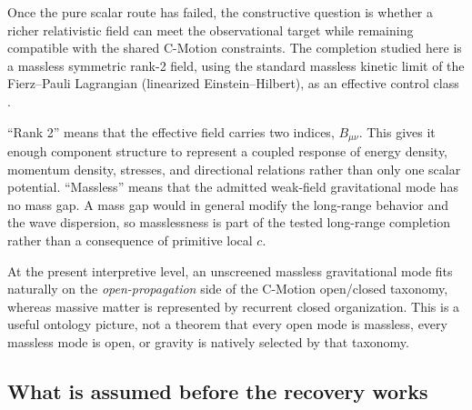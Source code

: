\documentclass[11pt]{article}
\newcommand{\cmotion}{\mbox{C-Motion}}
\theoremstyle{plain}
\theoremstyle{remark}
\begin{document}
Once the pure scalar route has failed, the constructive question is whether a richer
relativistic field can meet the observational target while remaining compatible with the
shared \cmotion{} constraints.  The completion studied here is a massless symmetric
rank-2 field, using the standard massless kinetic limit of the Fierz--Pauli Lagrangian
(linearized Einstein--Hilbert), as an effective control class
\cite{FierzPauli1939}.

``Rank 2'' means that the effective field carries two indices, $B_{\mu\nu}$.  This gives
it enough component structure to represent a coupled response of energy density,
momentum density, stresses, and directional relations rather than only one scalar
potential.  ``Massless'' means that the admitted weak-field gravitational mode has no
mass gap.  A mass gap would in general modify the long-range behavior and the wave
dispersion, so masslessness is part of the tested long-range completion rather than a
consequence of primitive local $c$.

At the present interpretive level, an unscreened massless gravitational mode fits
naturally on the \emph{open-propagation} side of the \cmotion{} open/closed taxonomy,
whereas massive matter is represented by recurrent closed organization.  This is a
useful ontology picture, not a theorem that every open mode is massless, every massless
mode is open, or gravity is natively selected by that taxonomy.

\subsection{What is assumed before the recovery works}
\label{sec:antecedents}
\end{document}
